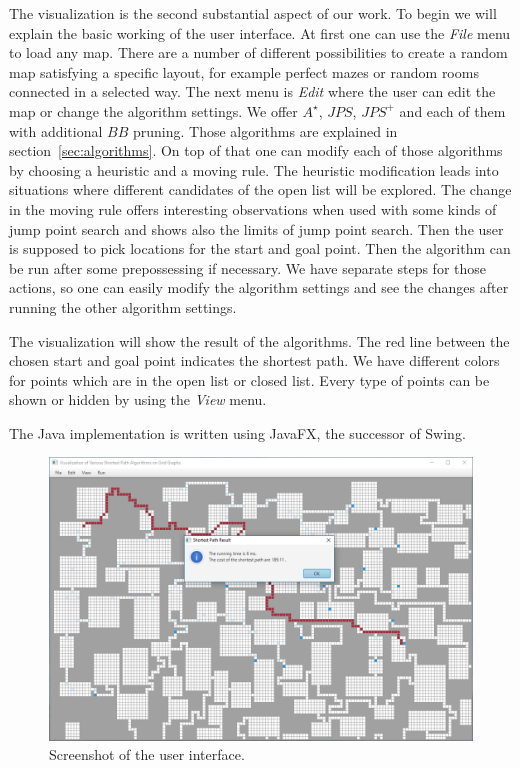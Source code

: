 \documentclass{article}
\begin{document}
    The visualization is the second substantial aspect of our work. To begin we will explain the basic working of the user interface. At first one can use the \textit{File} menu to load any map. There are a number of different possibilities to create a random map satisfying a specific layout, for example perfect mazes or random rooms connected in a selected way. The next menu is \textit{Edit} where the user can edit the map or change the algorithm settings. We offer $A^\star$, $JPS$, $JPS^+$ and each of them with additional $BB$ pruning. Those algorithms are explained in section~\ref{sec:algorithms}. On top of that one can modify each of those algorithms by choosing a heuristic and a moving rule. The heuristic modification leads into situations where different candidates of the open list will be explored. The change in the moving rule offers interesting observations when used with some kinds of jump point search and shows also the limits of jump point search. Then the user is supposed to pick locations for the start and goal point. Then the algorithm can be run after some prepossessing if necessary. We have separate steps for those actions, so one can easily modify the algorithm settings and see the changes after running the other algorithm settings.
    
    The visualization will show the result of the algorithms. The red line between the chosen start and goal point indicates the shortest path. We have different colors for points which are in the open list or closed list. Every type of points can be shown or hidden by using the \textit{View} menu.
    
    The Java implementation is written using JavaFX, the successor of Swing.
    
    \begin{figure}[!htb]
        \centering
        \includegraphics[width=\textwidth]{figures/javafx.png}
        \caption{Screenshot of the user interface.}
        \label{fig:javafx}
    \end{figure}
    
\end{document}
